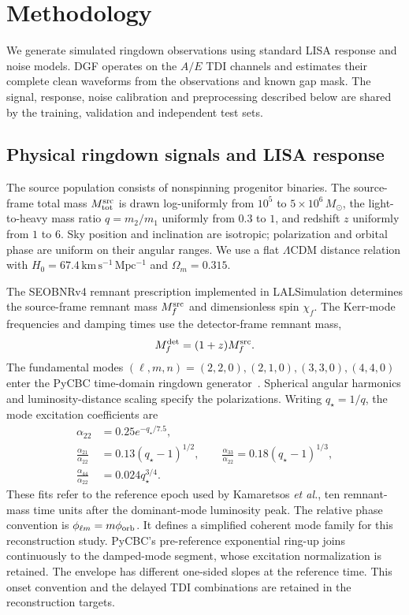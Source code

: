 \documentclass[10pt,prd,aps,a4paper,twocolumn,superscriptaddress,nofootinbib,floatfix]{revtex4-2}
\begin{document}
\section{Methodology}\label{sec:method}
We generate simulated ringdown observations using standard LISA response and noise models. DGF operates on the $A/E$ TDI channels and estimates their complete clean waveforms from the observations and known gap mask. The signal, response, noise calibration and preprocessing described below are shared by the training, validation and independent test sets.

\subsection{Physical ringdown signals and LISA response}\label{sec:physical_signals}
The source population consists of nonspinning progenitor binaries. The source-frame total mass $M_{\rm tot}^{\rm src}$ is drawn log-uniformly from $10^5$ to $5\times10^6\,M_\odot$, the light-to-heavy mass ratio $q=m_2/m_1$ uniformly from $0.3$ to $1$, and redshift $z$ uniformly from $1$ to $6$. Sky position and inclination are isotropic; polarization and orbital phase are uniform on their angular ranges. We use a flat $\Lambda$CDM distance relation with $H_0=67.4\,\mathrm{km\,s^{-1}\,Mpc^{-1}}$ and $\Omega_m=0.315$.

The SEOBNRv4 remnant prescription implemented in LALSimulation determines the source-frame remnant mass $M_f^{\rm src}$ and dimensionless spin $\chi_f$. The Kerr-mode frequencies and damping times use the detector-frame remnant mass,
\begin{equation}
M_f^{\rm det}=(1+z)M_f^{\rm src}.
\end{equation}
The fundamental modes $(\ell,m,n)=(2,2,0),(2,1,0),(3,3,0),(4,4,0)$ enter the PyCBC time-domain ringdown generator~\cite{berti2006gravitational,berti2009qnm,PyCBCRingdown}. Spherical angular harmonics and luminosity-distance scaling specify the polarizations. Writing $q_\star=1/q$, the mode excitation coefficients are~\cite{Kamaretsos2012}
\begin{align}
\alpha_{22}&=0.25e^{-q_\star/7.5},\nonumber\\
\frac{\alpha_{21}}{\alpha_{22}}&=0.13(q_\star-1)^{1/2},\qquad
\frac{\alpha_{33}}{\alpha_{22}}=0.18(q_\star-1)^{1/3},\nonumber\\
\frac{\alpha_{44}}{\alpha_{22}}&=0.024q_\star^{3/4}.
\end{align}
These fits refer to the reference epoch used by Kamaretsos \textit{et al.}, ten remnant-mass time units after the dominant-mode luminosity peak. The relative phase convention is $\phi_{\ell m}=m\phi_{\rm orb}$. It defines a simplified coherent mode family for this reconstruction study. PyCBC's pre-reference exponential ring-up joins continuously to the damped-mode segment, whose excitation normalization is retained. The envelope has different one-sided slopes at the reference time. This onset convention and the delayed TDI combinations are retained in the reconstruction targets.
\end{document}
